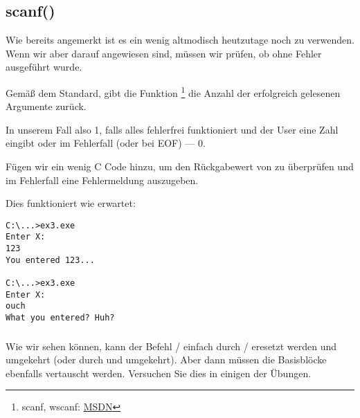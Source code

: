 \subsection{scanf()}
Wie bereits angemerkt ist es ein wenig altmodisch heutzutage noch \scanf zu verwenden. 
Wenn wir aber darauf angewiesen sind, müssen wir prüfen, ob \scanf ohne Fehler ausgeführt wurde.


Gemäß dem Standard, gibt die Funktion \scanf\footnote{scanf, wscanf: \href{http://go.yurichev.com/17255}{MSDN}} die
Anzahl der erfolgreich gelesenen Argumente zurück.

In unserem Fall also 1, falls alles fehlerfrei funktioniert und der User eine Zahl eingibt oder im Fehlerfall (oder bei
\ac{EOF}) --- 0.

Fügen wir ein wenig C Code hinzu, um den Rückgabewert von \scanf zu überprüfen und im Fehlerfall eine Fehlermeldung
auszugeben.

Dies funktioniert wie erwartet:

\begin{lstlisting}
C:\...>ex3.exe
Enter X:
123
You entered 123...

C:\...>ex3.exe
Enter X:
ouch
What you entered? Huh?
\end{lstlisting}






\subsubsection{\Exercise}

Wie wir sehen können, kann der Befehl / einfach durch / eresetzt werden und umgekehrt
(oder  durch  und umgekehrt).
Aber dann müssen die Basisblöcke ebenfalls vertauscht werden. 
Versuchen Sie dies in einigen der Übungen.

